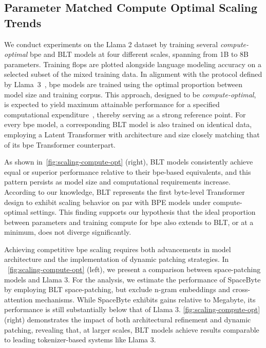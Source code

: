 \subsection{Parameter Matched Compute Optimal Scaling Trends}
\label{section:parameter-matched-scaling}
We conduct experiments on the Llama 2 dataset by training several \textit{compute-optimal} bpe and {\textsc BLT} models at four different scales, spanning from 1B to 8B parameters. Training flops are plotted alongside language modeling accuracy on a selected subset of the mixed training data. In alignment with the protocol defined by Llama~3~\citep{dubey2024llama}, bpe models are trained using the optimal proportion between model size and training corpus. This approach, designed to be \textit{compute-optimal}, is expected to yield maximum attainable performance for a specified computational expenditure~\citep{hoffmann2022training}, thereby serving as a strong reference point. For every bpe model, a corresponding {\textsc BLT} model is also trained on identical data, employing a Latent Transformer with architecture and size closely matching that of its bpe Transformer counterpart.

As shown in~\autoref{fig:scaling-compute-opt} (right), {\textsc BLT} models consistently achieve equal or superior performance relative to their bpe-based equivalents, and this pattern persists as model size and computational requirements increase. According to our knowledge, {\textsc BLT} represents the first byte-level Transformer design to exhibit scaling behavior on par with BPE models under compute-optimal settings. This finding supports our hypothesis that the ideal proportion between parameters and training compute for bpe also extends to {\textsc BLT}, or at a minimum, does not diverge significantly.

Achieving competitive bpe scaling requires both advancements in model architecture and the implementation of dynamic patching strategies. In ~\autoref{fig:scaling-compute-opt} (left), we present a comparison between space-patching models and Llama 3. For the analysis, we estimate the performance of SpaceByte \citep{slagle2024spacebyte} by employing {\textsc BLT} space-patching, but exclude n-gram embeddings and cross-attention mechanisms. While SpaceByte exhibits gains relative to Megabyte, its performance is still substantially below that of Llama 3. \autoref{fig:scaling-compute-opt} (right) demonstrates the impact of both architectural refinement and dynamic patching, revealing that, at larger scales, {\textsc BLT} models achieve results comparable to leading tokenizer-based systems like Llama 3.

